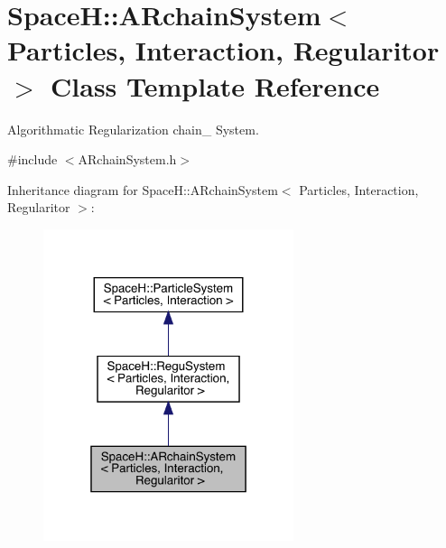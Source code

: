 \hypertarget{class_space_h_1_1_a_rchain_system}{}\section{SpaceH\+:\+:A\+Rchain\+System$<$ Particles, Interaction, Regularitor $>$ Class Template Reference}
\label{class_space_h_1_1_a_rchain_system}


Algorithmatic Regularization chain_ System.




{\ttfamily \#include $<$A\+Rchain\+System.\+h$>$}



Inheritance diagram for SpaceH\+:\+:A\+Rchain\+System$<$ Particles, Interaction, Regularitor $>$\+:
\nopagebreak
\begin{figure}[H]
\begin{center}
\leavevmode
\includegraphics[width=208pt]{class_space_h_1_1_a_rchain_system__inherit__graph}
\end{center}
\end{figure}


